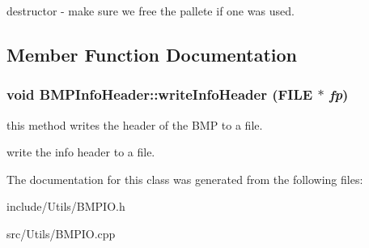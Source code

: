 destructor -\/ make sure we free the pallete if one was used. 

\subsection{Member Function Documentation}
\hypertarget{classCartWheel_1_1Util_1_1BMPInfoHeader_a2d77b91a2fd407fb33c2a87dd8f47857}{
\subsubsection[{writeInfoHeader}]{\setlength{\rightskip}{0pt plus 5cm}void BMPInfoHeader::writeInfoHeader (FILE $\ast$ {\em fp})}}
\label{classCartWheel_1_1Util_1_1BMPInfoHeader_a2d77b91a2fd407fb33c2a87dd8f47857}
this method writes the header of the BMP to a file.

write the info header to a file. 

The documentation for this class was generated from the following files:\begin{DoxyCompactItemize}
\item 
include/Utils/BMPIO.h\item 
src/Utils/BMPIO.cpp\end{DoxyCompactItemize}
